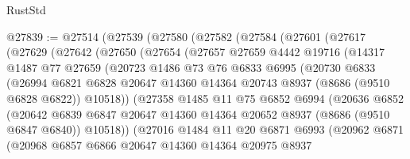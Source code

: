 \begin{lexlean}{RustStd}
\begin{coremodule}
@27839 := @27514
    (@27539
      (@27580
        (@27582
          (@27584
            (@27601
              (@27617
                (@27629
                  (@27642
                    (@27650
                      (@27654
                        (@27657
                          @27659
                          @4442
                          @19716
                          (@14317
                            @1487
                            @77
                            @27659
                            (@20723
                              @1486
                              @73
                              @76
                              @6833
                              @6995
                              (@20730
                                @6833
                                (@26994
                                  @6821
                                  @6828
                                  @20647
                                  @14360
                                  @14364
                                  @20743
                                  @8937
                                  (@8686 (@9510 @6828 @6822))
                                  @10518))
                              (@27358
                                @1485
                                @11
                                @75
                                @6852
                                @6994
                                (@20636
                                  @6852
                                  (@20642
                                    @6839
                                    @6847
                                    @20647
                                    @14360
                                    @14364
                                    @20652
                                    @8937
                                    (@8686 (@9510 @6847 @6840))
                                    @10518))
                                (@27016
                                  @1484
                                  @11
                                  @20
                                  @6871
                                  @6993
                                  (@20962
                                    @6871
                                    (@20968
                                      @6857
                                      @6866
                                      @20647
                                      @14360
                                      @14364
                                      @20975
                                      @8937

\end{coremodule}
\end{lexlean}
